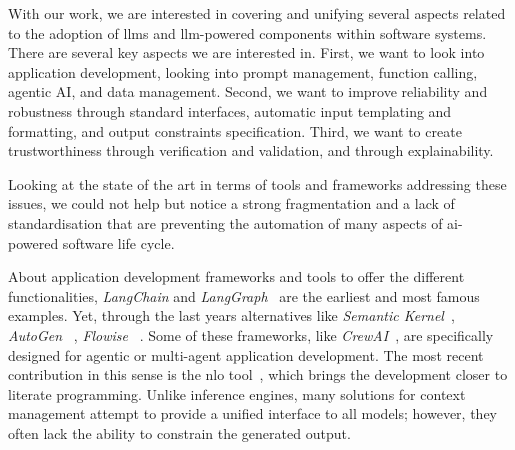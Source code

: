 \documentclass[manuscript,screen]{acmart}
\begin{document}

With our work, we are interested in covering and unifying several aspects related to the adoption of \acp{llm} and \ac{llm}-powered components within software systems.
There are several key aspects we are interested in.
First, we want to look into application development, looking into prompt management, function calling, agentic AI, and data management.
Second, we want to improve reliability and robustness through standard interfaces, automatic input templating and formatting, and output constraints specification. Third, we want to create trustworthiness through verification and validation, and through explainability.

Looking at the state of the art in terms of tools and frameworks addressing these issues, we could not help but notice a strong fragmentation and a lack of standardisation that are preventing the automation of many aspects of \ac{ai}-powered software life cycle.

About application development frameworks and tools to offer the different functionalities, \emph{LangChain} and \emph{LangGraph}~\cite{docs/introduction/} are the earliest and most famous examples.
Yet, through the last years alternatives like \emph{Semantic Kernel}~\cite{https://github.com/microsoft/semantic-kernel}, \emph{AutoGen} ~\cite{DBLP:journals/corr/abs-2308-08155}, \emph{Flowise} ~\cite{https://github.com/FlowiseAI/Flowise}.
Some of these frameworks, like \emph{CrewAI}~\cite{https://github.com/crewAIInc/crewA}, are specifically designed for agentic or multi-agent application development.
The most recent contribution in this sense is the \ac{nlo} tool~\cite{DBLP:conf/sigsoft/ShiAACGKNPRRRST25}, which brings the development closer to literate programming.
Unlike inference engines, many solutions for context management attempt to provide a unified interface to all models; however, they often lack the ability to constrain the generated output.
\end{document}
